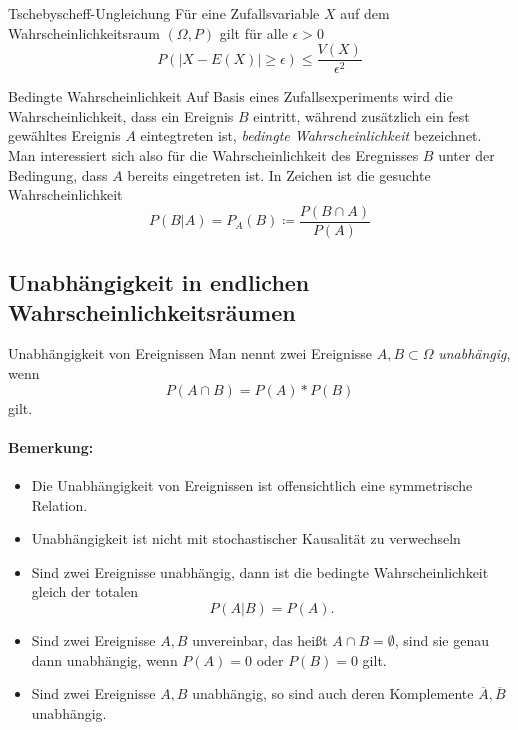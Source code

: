 \begin{satz}{Tschebyscheff-Ungleichung}
	Für eine Zufallsvariable $X$ auf dem Wahrscheinlichkeitsraum $(\Omega,P)$ gilt für alle $\epsilon>0$
	\begin{equation*}
		P(|X-E(X)|\geq \epsilon)\leq \frac{V(X)}{\epsilon^2}
	\end{equation*}
\end{satz}

\begin{definition}{Bedingte Wahrscheinlichkeit}
	Auf Basis eines Zufallsexperiments wird die Wahrscheinlichkeit, dass ein Ereignis $B$ eintritt, während zusätzlich ein fest gewähltes Ereignis $A$ eintegtreten ist, \emph{bedingte Wahrscheinlichkeit} bezeichnet. Man interessiert sich also für die Wahrscheinlichkeit des Eregnisses $B$ unter der Bedingung, dass $A$ bereits eingetreten ist. In Zeichen ist die gesuchte Wahrscheinlichkeit
	\begin{equation*}
		P(B|A)=P_A(B)\coloneqq\frac{P(B\cap A)}{P(A)}
	\end{equation*}
\end{definition}

\subsection{Unabhängigkeit in endlichen Wahrscheinlichkeitsräumen}
\begin{definition}{Unabhängigkeit von Ereignissen}
	Man nennt zwei Ereignisse $A,B\subset \Omega$ \emph{unabhängig}, wenn
	\begin{equation*}
		P(A\cap B)=P(A)*P(B)
	\end{equation*}
	gilt.
\end{definition}
\paragraph{Bemerkung:}
\begin{itemize}
	\item Die Unabhängigkeit von Ereignissen ist offensichtlich eine symmetrische Relation.
	\item Unabhängigkeit ist nicht mit stochastischer Kausalität zu verwechseln
	\item Sind zwei Ereignisse unabhängig, dann ist die bedingte Wahrscheinlichkeit gleich der totalen
	\begin{equation*}
		P(A|B)=P(A).
	\end{equation*}
	\item Sind zwei Ereignisse $A,B$ unvereinbar, das heißt $A\cap B=\emptyset$, sind sie genau dann unabhängig, wenn $P(A)=0$ oder $P(B)=0$ gilt.
	\item Sind zwei Ereignisse $A,B$ unabhängig, so sind auch deren Komplemente $\overline A, \overline B$ unabhängig.
\end{itemize}


